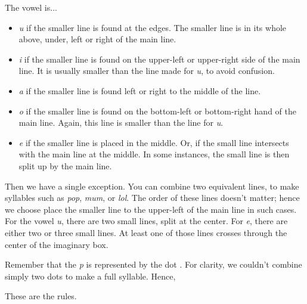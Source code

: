 The vowel is...
\begin{itemize}
\item {\it u} if the smaller line is found at the edges. The smaller line is in its whole above, under, left or right of the main line. 

\item {\it i} if the smaller line is found on the upper-left or upper-right side of the main line. It is usually smaller than the line made for {\it u}, to avoid confusion. 

\item {\it a} if the smaller line is found left or right to the middle of the line. 

\item {\it o} if the smaller line is found on the bottom-left or bottom-right hand of the main line. Again, this line is smaller than the line for {\it u}. 

\item{\it e} if the smaller line is placed in the middle. Or, if the small line intersects with the main line at the middle. In some instances, the small line is then split up by the main line.  
\end{itemize}

Then we have a single exception. You can combine two equivalent lines, to make syllables such as {\it pop}, {\it mum}, or {\it lol}. The order of these lines doesn't matter; hence we choose place the smaller line to the upper-left of the main line in such cases. For the vowel {\it u}, there are two small lines, split at the center. For {\it e}, there are either two or three small lines. At least one of those lines crosses through the center of the imaginary box.

Remember that the {\it p} is represented by the dot  . For clarity, we couldn't combine simply two dots to make a full syllable. Hence, 


These are the rules. 








